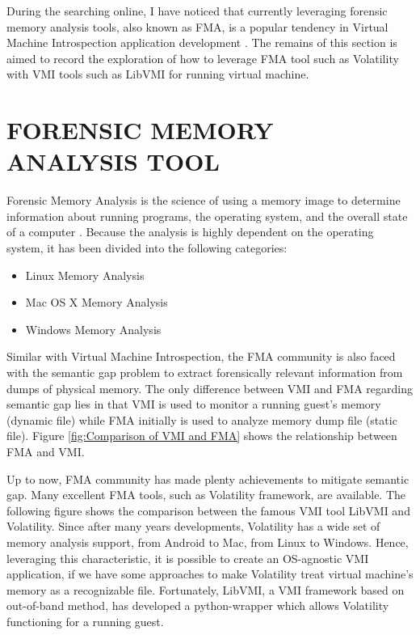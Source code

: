 During the searching online, I have noticed that currently leveraging forensic memory analysis tools, also known as FMA, is a popular tendency in Virtual Machine Introspection application development \cite{Reference33}. The remains of this section is aimed to record the exploration of how to leverage FMA tool such as Volatility with VMI tools such as LibVMI for running virtual machine.

\section{FORENSIC MEMORY ANALYSIS TOOL}
Forensic Memory Analysis is the science of using a memory image to determine information about running programs, the operating system, and the overall state of a computer \cite{Reference34}. Because the analysis is highly dependent on the operating system, it has been divided into the following categories:
\begin{itemize}
    \item Linux Memory Analysis
    \item Mac OS X Memory Analysis
    \item Windows Memory Analysis
\end{itemize}
Similar with Virtual Machine Introspection, the FMA community is also faced with the semantic gap problem to extract 
forensically relevant information from dumps of physical memory. The only difference between VMI and FMA regarding 
semantic gap lies in that VMI is used to monitor a running guest’s memory (dynamic file) while FMA initially is used to 
analyze memory dump file (static file). Figure \ref{fig:Comparison of VMI and FMA} shows the relationship between FMA and VMI.

Up to now, FMA community has made plenty achievements to mitigate semantic gap. Many excellent FMA tools, such as Volatility framework, are available. The following figure shows the comparison between the famous VMI tool LibVMI and Volatility. Since after many years developments, Volatility has a wide set of memory analysis support, from Android to Mac, from Linux to Windows. Hence, leveraging this characteristic, it is possible to create an OS-agnostic VMI application, if we have some approaches to make Volatility treat virtual machine’s memory as a recognizable file. Fortunately, LibVMI, a VMI framework based on out-of-band method, has developed a python-wrapper which allows Volatility functioning for a running guest.

